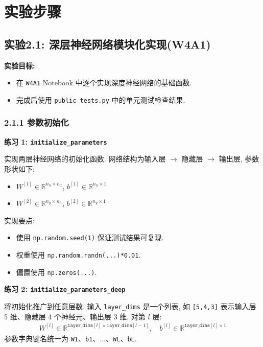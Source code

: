 \documentclass{../../nndlcourse}
\begin{document}
\section{实验步骤}

\subsection*{实验2.1: 深层神经网络模块化实现(W4A1)}

\textbf{实验目标:}
\begin{itemize}
    \item 在 \texttt{W4A1} Notebook 中逐个实现深度神经网络的基础函数.
    \item 完成后使用 \texttt{public\_tests.py} 中的单元测试检查结果.
\end{itemize}

\subsubsection*{2.1.1 参数初始化}

\textbf{练习 1: \texttt{initialize\_parameters}}

实现两层神经网络的初始化函数. 网络结构为输入层 $\to$ 隐藏层 $\to$ 输出层, 参数形状如下:
\begin{itemize}
    \item $W^{[1]}\in\mathbb{R}^{n_h\times n_x}$, $b^{[1]}\in\mathbb{R}^{n_h\times1}$
    \item $W^{[2]}\in\mathbb{R}^{n_y\times n_h}$, $b^{[2]}\in\mathbb{R}^{n_y\times1}$
\end{itemize}
实现要点:
\begin{itemize}
    \item 使用 \texttt{np.random.seed(1)} 保证测试结果可复现.
    \item 权重使用 \texttt{np.random.randn(...)*0.01}.
    \item 偏置使用 \texttt{np.zeros(...)}.
\end{itemize}

\textbf{练习 2: \texttt{initialize\_parameters\_deep}}

将初始化推广到任意层数. 输入 \texttt{layer\_dims} 是一个列表, 如 \texttt{[5,4,3]} 表示输入层 5 维、隐藏层 4 个神经元、输出层 3 维. 对第 $l$ 层:
\begin{align}
    W^{[l]}\in\mathbb{R}^{\texttt{layer\_dims}[l]\times \texttt{layer\_dims}[l-1]},\quad
    b^{[l]}\in\mathbb{R}^{\texttt{layer\_dims}[l]\times1}
\end{align}
参数字典键名统一为 \texttt{W1}、\texttt{b1}、$\ldots$、\texttt{WL}、\texttt{bL}.
\end{document}
